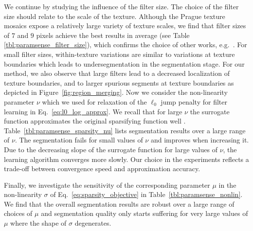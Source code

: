 \documentclass[journal]{IEEEtran}
\begin{document}
We continue by studying the influence of the filter size.
The choice of the filter size should relate to the scale of the texture.
Although the Prague texture mosaics expose a relatively large variety of texture scales, we find that filter sizes of $7$ and $9$ pixels achieve the best results in average (see Table \ref{tbl:paramsense_filter_size}), which confirms the choice of other works, e.g.\ \cite{mevenkamp2016, yuan2015factorization}. For small filter sizes, within-texture variations are similar to variations at texture boundaries which leads to undersegmentation in the segmentation stage. 
For our method, we also observe that large filters lead to a decreased localization of texture boundaries, and to larger spurious segments at texture boundaries as depicted in Figure~\ref{fig:region_merging}.  
Now we consider the non-linearity parameter $\nu$
which we used for relaxation of the $\ell_0$ jump penalty for filter learning in Eq.~\eqref{eq:l0_log_approx}.
We recall that for large $\nu$ 
the surrogate function  approximates the original sparsifying function well \cite{Kiechle2013,nieuwenhuis2013}.
Table~\ref{tbl:paramsense_sparsity_nu} lists segmentation results over a large range of $\nu$.
The segmentation fails for small values of $\nu$ and improves when increasing it. Due to the decreasing slope of the surrogate function for large values of $\nu$, the learning algorithm converges more slowly. Our choice in the experiments reflects a trade-off between convergence speed and approximation accuracy.

Finally, we investigate the sensitivity of the corresponding parameter $\mu$ in the non-linearity $\sigma$ of Eq.~\eqref{eq:sparsity_objective} in Table~\ref{tbl:paramsense_nonlin}. We find that the overall segmentation results are robust over a large range of choices of $\mu$ and segmentation quality only starts suffering for very large values of $\mu$ where the shape of $\sigma$ degenerates. 
\end{document}
